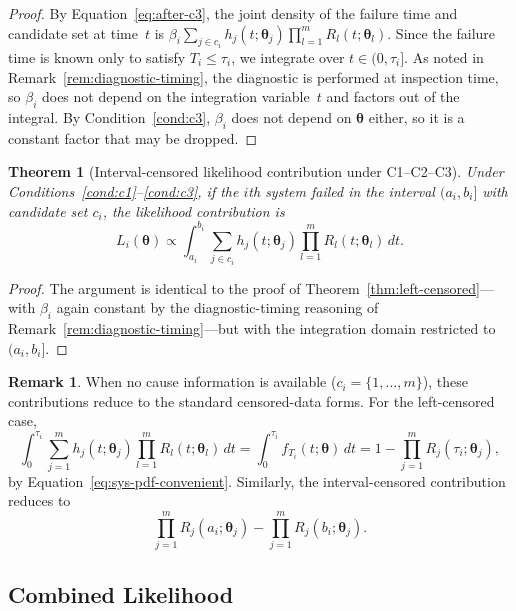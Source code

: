 \documentclass[11pt]{article}
\theoremstyle{definition}
\newtheorem{remark}{Remark}
\theoremstyle{plain}
\newtheorem{theorem}{Theorem}
\renewcommand{\v}[1]{\boldsymbol{#1}}
\newcommand{\btheta}{\v{\theta}}
\begin{document}
\begin{proof}
By Equation~\eqref{eq:after-c3}, the joint density of the failure time
and candidate set at time~$t$ is
$\beta_i \sum_{j \in c_i} h_j(t; \v{\theta}_j)
\prod_{l=1}^m R_l(t; \v{\theta}_l)$.
Since the failure time is known only to satisfy $T_i \leq \tau_i$, we
integrate over $t \in (0, \tau_i]$.
As noted in Remark~\ref{rem:diagnostic-timing}, the diagnostic is
performed at inspection time, so $\beta_i$ does not depend on the
integration variable~$t$ and factors out of the integral.
By Condition~\ref{cond:c3}, $\beta_i$ does not depend on $\btheta$
either, so it is a constant factor that may be dropped.
\end{proof}

\begin{theorem}[Interval-censored likelihood contribution under C1--C2--C3]
\label{thm:interval-censored}
Under Conditions~\ref{cond:c1}--\ref{cond:c3}, if the $i$th system
failed in the interval $(a_i, b_i]$ with candidate set $c_i$, the
likelihood contribution is
\begin{equation}
\label{eq:interval-censored}
    L_i(\btheta) \propto
    \int_{a_i}^{b_i}
    \sum_{j \in c_i} h_j(t; \v{\theta}_j)
    \prod_{l=1}^m R_l(t; \v{\theta}_l) \, dt.
\end{equation}
\end{theorem}

\begin{proof}
The argument is identical to the proof of
Theorem~\ref{thm:left-censored}---with $\beta_i$ again constant by the
diagnostic-timing reasoning of Remark~\ref{rem:diagnostic-timing}---but
with the integration domain restricted to $(a_i, b_i]$.
\end{proof}

\begin{remark}
When no cause information is available ($c_i = \{1, \ldots, m\}$), these
contributions reduce to the standard censored-data forms.
For the left-censored case,
\[
    \int_0^{\tau_i}
    \sum_{j=1}^m h_j(t; \v{\theta}_j)
    \prod_{l=1}^m R_l(t; \v{\theta}_l) \, dt
    = \int_0^{\tau_i} f_{T_i}(t; \btheta) \, dt
    = 1 - \prod_{j=1}^m R_j(\tau_i; \v{\theta}_j),
\]
by Equation~\eqref{eq:sys-pdf-convenient}.
Similarly, the interval-censored contribution reduces to
\[
    \prod_{j=1}^m R_j(a_i; \v{\theta}_j)
    - \prod_{j=1}^m R_j(b_i; \v{\theta}_j).
\]
\end{remark}

\subsection{Combined Likelihood}
\label{sec:combined-likelihood}
\end{document}
